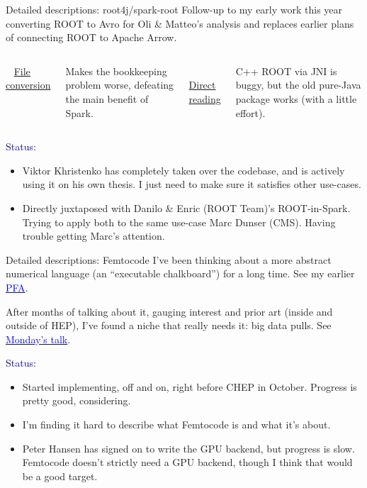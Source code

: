 \documentclass{beamer}
\begin{document}
\begin{frame}{Detailed descriptions: root4j/spark-root}
\vspace{0.5 cm}
Follow-up to my early work this year converting ROOT to Avro for Oli \& Matteo's analysis and replaces earlier plans of connecting ROOT to Apache Arrow.

\vspace{0.3 cm}
\begin{columns}[t]
\mbox{ } \hfill \underline{File conversion} \hfill \mbox{ }

\vspace{0.1 cm}
Makes the bookkeeping problem worse, defeating the main benefit of Spark.

\mbox{ } \hfill \underline{Direct reading} \hfill \mbox{ }

\vspace{0.1 cm}
C++ ROOT via JNI is buggy, but the old pure-Java package works (with a little effort).
\end{columns}

\vspace{0.4 cm}
\textcolor{darkblue}{Status:}
\begin{itemize}
\item Viktor Khristenko has completely taken over the codebase, and is actively using it on his own thesis. I just need to make sure it satisfies other use-cases.
\item Directly juxtaposed with Danilo \& Enric (ROOT Team)'s ROOT-in-Spark. Trying to apply both to the same use-case Marc Dunser (CMS). Having trouble getting Marc's attention.
\end{itemize}
\end{frame}

\begin{frame}{Detailed descriptions: Femtocode}
\vspace{0.5 cm}
I've been thinking about a more abstract numerical language (an ``executable chalkboard'') for a long time. See my earlier \href{http://dmg.org/pfa/}{\textcolor{blue}{PFA}}.

\vspace{0.3 cm}
After months of talking about it, gauging interest and prior art (inside and outside of HEP), I've found a niche that really needs it: big data pulls. See \href{https://indico.cern.ch/event/594180/}{\textcolor{blue}{Monday's talk}}.

\vspace{0.4 cm}
\textcolor{darkblue}{Status:}
\begin{itemize}
\item Started implementing, off and on, right before CHEP in October. Progress is pretty good, considering.
\item I'm finding it hard to describe what Femtocode is and what it's about.
\item Peter Hansen has signed on to write the GPU backend, but progress is slow. Femtocode doesn't strictly need a GPU backend, though I think that would be a good target.
\end{itemize}
\end{frame}
\end{document}
